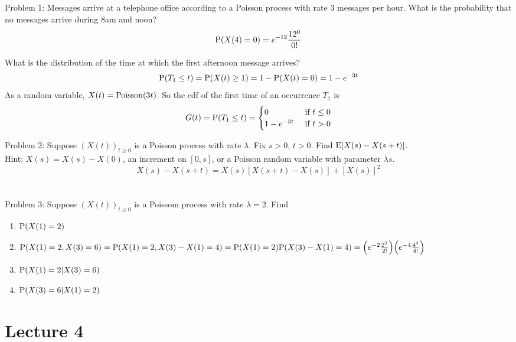 \documentclass[12pt]{article}
\begin{document}
Problem 1: Messages arrive at a telephone office according to a Poisson process with rate $3$ messages per hour. What is the probability that no messages arrive during 8am and noon?
$$ \mathrm{P}( X(4) = 0 ) = e^{-12} \frac{12^0}{0!} $$ 

 What is the distribution of the time at which the first afternoon message arrives?
 $$ \mathrm{P}( T_1 \leq t ) = \mathrm{P}( X(t) \geq 1 ) = 1 - \mathrm{P}( X(t) = 0 ) = 1 - e^{-3t} $$ 
 As a random variable, $X(t) = \text{Poisson}( 3t )$. So the cdf of the first time of an occurrence $T_1$ is $$G(t) = \mathrm{P}( T_1 \leq t ) = \begin{cases} 0 &\text{ if } t \leq 0 \\ 1 - e^{-3t} &\text{ if } t > 0 \end{cases} $$ 

Problem 2: Suppose $(X(t))_{t \geq 0}$ is a Poisson process with rate $\lambda$. Fix $s > 0$, $t>0$. Find $\mathrm{E}[ X(s) - X(s + t) ]$. \\ Hint: $X(s) = X(s) - X(0)$, an increment on $[0,s]$, or a Poisson random variable with parameter $\lambda s$. 
$$ X(s) - X(s + t) = X(s)[X(s+t) - X(s)] + [X(s)]^2 $$ \\~\\

Problem 3: Suppose $(X(t))_{t \geq 0}$ is a Poissom process with rate $\lambda = 2$. Find \begin{enumerate}
\item $\mathrm{P}( X(1) = 2 )$
\item $\mathrm{P}( X(1) = 2, X(3) = 6 ) = \mathrm{P}( X(1) = 2, X(3) - X(1) = 4 ) = \mathrm{P}( X(1) = 2 )\mathrm{P}( X(3) - X(1) = 4 ) = \Big( e^{-2} \frac{2^2}{2!}\Big) \Big( e^{-4} \frac{4^4}{4!} \Big) $
\item $\mathrm{P}( X(1) = 2 | X(3) = 6 )$
\item $\mathrm{P}( X(3) = 6 | X(1) = 2 )$ 
\end{enumerate}

\section{Lecture 4} 
\end{document}
